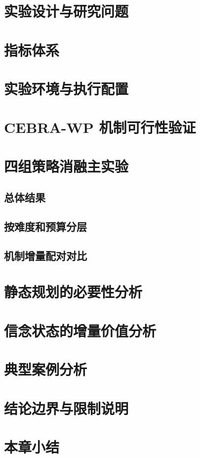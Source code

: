
\section{实验设计与研究问题}


\section{指标体系}


\section{实验环境与执行配置}


\section{CEBRA-WP 机制可行性验证}


\section{四组策略消融主实验}

\subsection{总体结果}
\subsection{按难度和预算分层}
\subsection{机制增量配对对比}


\section{静态规划的必要性分析}


\section{信念状态的增量价值分析}


\section{典型案例分析}


\section{结论边界与限制说明}


\section{本章小结}

